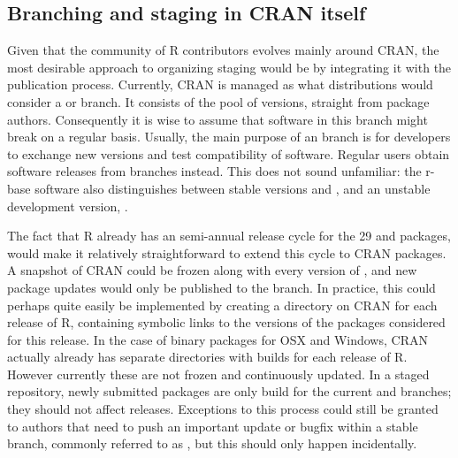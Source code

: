 \subsection{Branching and staging in CRAN itself}

Given that the community of R contributors evolves mainly around CRAN, the most
desirable approach to organizing staging would be by integrating it with the
publication process. Currently, CRAN is managed as what distributions would
consider a  or  branch. It consists of the pool
of  versions, straight from package authors. Consequently it
is wise to assume that software in this branch might break on a regular
basis. Usually, the main purpose of an
 branch is for developers to exchange new versions and test
compatibility of software. Regular users obtain software releases from
 branches instead. This does not sound unfamiliar: the r-base
software also distinguishes between stable versions  and
, and an unstable development version, .

The fact that R already has an semi-annual release cycle for the 29 
and  packages, would make it relatively straightforward to
extend this cycle to CRAN packages. A snapshot of CRAN could be frozen along
with every version of , and new package updates would only be
published to the  branch. In practice, this could perhaps quite
easily be implemented by creating a directory on CRAN for each release of R,
containing symbolic links to the versions of the packages considered
 for this release. In the case of binary packages for OSX and
Windows, CRAN actually already has separate directories with builds for each
release of R. However currently these are not frozen and continuously updated.
In a staged repository, newly submitted packages are only build for the current
 and  branches; they should not affect 
releases. Exceptions to this process could still be granted to authors that need
to push an important update or bugfix within a stable branch, commonly referred
to as , but this should only happen incidentally.

